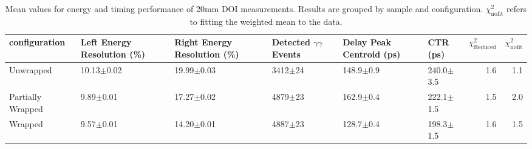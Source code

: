 \begin{table}
\caption{\label{doictrresults-20} Mean values for energy and timing performance of 20mm DOI measurements. Results are grouped by sample and configuration. $\chi^2_\text{nofit}$ refers to fitting the weighted mean to the data.}
\begin{tabular}{llllllrr}
\hline
configuration & Left Energy Resolution (\%) & Right Energy Resolution (\%) & Detected $\gamma\gamma$ Events & Delay Peak Centroid (ps)  & CTR (ps) &  $\chi^2_\text{Reduced}$ &  $\chi^2_\text{nofit}$ \\
\hline
Unwrapped     &  10.13$\pm$0.02 &  19.99$\pm$0.03 &  3412$\pm$24 &  148.9$\pm$0.9 &  240.0$\pm$3.5 &        1.6 &    1.1 \\
Partially Wrapped   &   9.89$\pm$0.01 &  17.27$\pm$0.02 &  4879$\pm$23 &  162.9$\pm$0.4 &  222.1$\pm$1.5 &        1.5 &    2.0 \\
Wrapped       &   9.57$\pm$0.01 &  14.20$\pm$0.01 &  4887$\pm$23 &  128.7$\pm$0.4 &  198.3$\pm$1.5 &        1.6 &    1.5 \\
\hline
\end{tabular}
\end{table}


